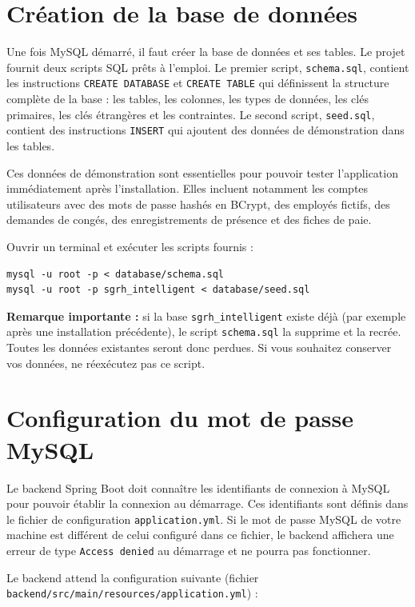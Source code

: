 \documentclass[12pt,a4paper]{report}
\begin{document}
\section{Création de la base de données}

Une fois MySQL démarré, il faut créer la base de données et ses tables. Le projet fournit deux scripts SQL prêts à l'emploi. Le premier script, \texttt{schema.sql}, contient les instructions \texttt{CREATE DATABASE} et \texttt{CREATE TABLE} qui définissent la structure complète de la base : les tables, les colonnes, les types de données, les clés primaires, les clés étrangères et les contraintes. Le second script, \texttt{seed.sql}, contient des instructions \texttt{INSERT} qui ajoutent des données de démonstration dans les tables.

Ces données de démonstration sont essentielles pour pouvoir tester l'application immédiatement après l'installation. Elles incluent notamment les comptes utilisateurs avec des mots de passe hashés en BCrypt, des employés fictifs, des demandes de congés, des enregistrements de présence et des fiches de paie.

Ouvrir un terminal et exécuter les scripts fournis :

\begin{verbatim}
mysql -u root -p < database/schema.sql
mysql -u root -p sgrh_intelligent < database/seed.sql
\end{verbatim}

\textbf{Remarque importante :} si la base \texttt{sgrh\_intelligent} existe déjà (par exemple après une installation précédente), le script \texttt{schema.sql} la supprime et la recrée. Toutes les données existantes seront donc perdues. Si vous souhaitez conserver vos données, ne réexécutez pas ce script.

\section{Configuration du mot de passe MySQL}

Le backend Spring Boot doit connaître les identifiants de connexion à MySQL pour pouvoir établir la connexion au démarrage. Ces identifiants sont définis dans le fichier de configuration \texttt{application.yml}. Si le mot de passe MySQL de votre machine est différent de celui configuré dans ce fichier, le backend affichera une erreur de type \texttt{Access denied} au démarrage et ne pourra pas fonctionner.

Le backend attend la configuration suivante (fichier \texttt{backend/src/main/resources/application.yml}) :
\end{document}

